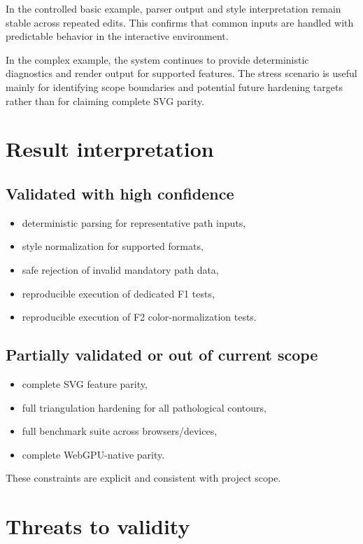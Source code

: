 In the controlled basic example, parser output and style interpretation remain stable across repeated edits.
This confirms that common inputs are handled with predictable behavior in the interactive environment.

In the complex example, the system continues to provide deterministic diagnostics and render output for supported features.
The stress scenario is useful mainly for identifying scope boundaries and potential future hardening targets rather than for claiming complete SVG parity.

\section{Result interpretation}

\subsection{Validated with high confidence}

\begin{itemize}
\item deterministic parsing for representative path inputs,
\item style normalization for supported formats,
\item safe rejection of invalid mandatory path data,
\item reproducible execution of dedicated F1 tests,
\item reproducible execution of F2 color-normalization tests.
\end{itemize}

\subsection{Partially validated or out of current scope}

\begin{itemize}
\item complete SVG feature parity,
\item full triangulation hardening for all pathological contours,
\item full benchmark suite across browsers/devices,
\item complete WebGPU-native parity.
\end{itemize}

These constraints are explicit and consistent with project scope.

\section{Threats to validity}

